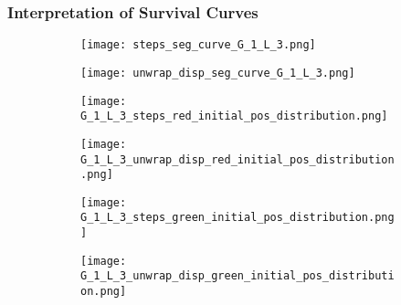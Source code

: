    

\subsubsection{Interpretation of Survival Curves}


   \begin{figure}
        \centering
        \begin{subfigure}[b]{0.45\textwidth}
          \texttt{[image: steps\_seg\_curve\_G\_1\_L\_3.png]}
          \caption{}
          \label{fig:steps_seg_curve_G_1_L_3}
        \end{subfigure}
        \hfill
        \begin{subfigure}[b]{0.45\textwidth}
          \texttt{[image: unwrap\_disp\_seg\_curve\_G\_1\_L\_3.png]}
          \caption{}
          \label{fig:disp_seg_curve_G_1_L_3}
        \end{subfigure}
        \caption{}
        \label{fig:seg_curve_G_1_L_3_steps_disp}
   \end{figure}



   \begin{figure}
        \centering
        \begin{subfigure}[b]{0.45\textwidth}
          \texttt{[image: G\_1\_L\_3\_steps\_red\_initial\_pos\_distribution.png]}
          \caption{}
          \label{fig:G_1_L_3_steps_red_initial_pos_distribution}
        \end{subfigure}
        
        \begin{subfigure}[b]{0.45\textwidth}
          \texttt{[image: G\_1\_L\_3\_unwrap\_disp\_red\_initial\_pos\_distribution.png]}
          \caption{}
          \label{fig:G_1_L_3_disp_red_initial_pos_distribution}
        \end{subfigure}
        \caption{}
        \label{fig:G_1_L_3_steps_disp_red}
   \end{figure}


   \begin{figure}
        \centering
        \begin{subfigure}[b]{0.45\textwidth}
          \texttt{[image: G\_1\_L\_3\_steps\_green\_initial\_pos\_distribution.png]}
          \caption{}
          \label{fig:G_1_L_3_steps_green_initial_pos_distribution}
        \end{subfigure}
        
        \begin{subfigure}[b]{0.45\textwidth}
          \texttt{[image: G\_1\_L\_3\_unwrap\_disp\_green\_initial\_pos\_distribution.png]}
          \caption{}
          \label{fig:G_1_L_3_disp_green_initial_pos_distribution}
        \end{subfigure}
        \caption{}
        \label{fig:G_1_L_3_steps_disp_green}
   \end{figure}




